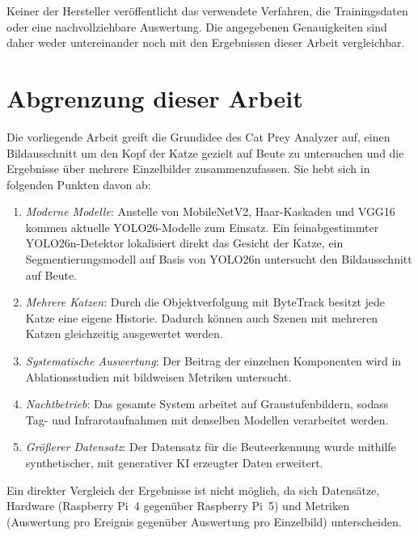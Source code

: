 Keiner der Hersteller veröffentlicht das verwendete Verfahren, die Trainingsdaten oder eine nachvollziehbare Auswertung. Die angegebenen Genauigkeiten sind daher weder untereinander noch mit den Ergebnissen dieser Arbeit vergleichbar.

\section{Abgrenzung dieser Arbeit}
\label{sec:rw_abgrenzung}
Die vorliegende Arbeit greift die Grundidee des Cat Prey Analyzer auf, einen Bildausschnitt um den Kopf der Katze gezielt auf Beute zu untersuchen und die Ergebnisse über mehrere Einzelbilder zusammenzufassen. Sie hebt sich in folgenden Punkten davon ab:

\begin{enumerate}
	\item \emph{Moderne Modelle}: Anstelle von MobileNetV2, Haar-Kaskaden und VGG16 kommen aktuelle YOLO26-Modelle zum Einsatz. Ein feinabgestimmter YOLO26n-Detektor lokalisiert direkt das Gesicht der Katze, ein Segmentierungsmodell auf Basis von YOLO26n untersucht den Bildausschnitt auf Beute.
	\item \emph{Mehrere Katzen}: Durch die Objektverfolgung mit ByteTrack besitzt jede Katze eine eigene Historie. Dadurch können auch Szenen mit mehreren Katzen gleichzeitig ausgewertet werden.
	\item \emph{Systematische Auswertung}: Der Beitrag der einzelnen Komponenten wird in Ablationsstudien mit bildweisen Metriken untersucht.
	\item \emph{Nachtbetrieb}: Das gesamte System arbeitet auf Graustufenbildern, sodass Tag- und Infrarotaufnahmen mit denselben Modellen verarbeitet werden.
	\item \emph{Größerer Datensatz}: Der Datensatz für die Beuteerkennung wurde mithilfe synthetischer, mit generativer KI erzeugter Daten erweitert.
\end{enumerate}

Ein direkter Vergleich der Ergebnisse ist nicht möglich, da sich Datensätze, Hardware (Raspberry Pi~4 gegenüber Raspberry Pi~5) und Metriken (Auswertung pro Ereignis gegenüber Auswertung pro Einzelbild) unterscheiden.
